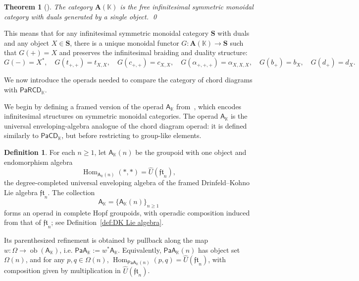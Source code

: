 \documentclass{amsart}
\newcommand{\bA}{\mathbf{A}}
\newcommand{\bS}{\mathbf{S}}
\newcommand{\kk}{\mathbb{K}}    %
\newcommand{\PaA}{\mathsf{PaA}}
\newcommand{\PaRCD}{\mathsf{PaRCD}}
\newcommand{\PaCD}{\mathsf{PaCD}}
\newcommand{\A}{\mathsf{A}}
\newcommand{\magma}{\Omega}
\newcommand{\hA}{{\A}_{\kk}}
\newcommand{\hPaA}{{\PaA}_{\kk}}
\newcommand{\hPaCD}{{\PaCD}_{\kk}}
\newcommand{\hPaRCD}{{\PaRCD}_{\kk}}
\newcommand{\Hom}{\operatorname{Hom}}
\newcommand{\ob}{\operatorname{ob}}
\newtheorem{thm}[theorem]{Theorem}%
\theoremstyle{definition}
\newtheorem{definition}[theorem]{Definition}%
\numberwithin{equation}{section}
\begin{document}


\begin{thm}[\cite{Cartier1992Vessiliev_Invarients, KT_Tangles}]
The category $\bA(\kk)$ is the free infinitesimal symmetric monoidal category with duals generated by a single object. \qed
\end{thm}

This means that for any infinitesimal symmetric monoidal category $\bS$ with duals and any object $X \in \bS$, there is a unique monoidal functor $G: \bA(\kk) \to \bS$ such that $G(+) = X$ and  preserves the infinitesimal braiding and duality structure:
\[
G(-) = X^*, \quad G(t_{+,+}) = t_{X,X}, \quad G(c_{+,+}) = c_{X,X}, \quad G(\alpha_{+,+,+}) = \alpha_{X,X,X}, \quad G(b_{+}) = b_X, \quad G(d_{+}) = d_X.
\]



We now introduce the operads needed to compare the category of chord diagrams with $\hPaRCD$.

We begin by defining a framed version of the operad $\hA$ from~\cite[Section~10.3.1]{FresseBook1}, which encodes infinitesimal structures on symmetric monoidal categories. The operad $\hA$ is the universal enveloping-algebra analogue of the chord diagram operad: it is defined similarly to $\hPaCD$, but before restricting to group-like elements.

\begin{definition}
For each $n\geq 1$, let $\hA(n)$ be the groupoid with one object and endomorphism algebra
\[
\Hom_{\hA(n)}(*,*)=\hat U(\mathfrak{ft}_n),
\]
the degree-completed universal enveloping algebra of the framed Drinfeld--Kohno Lie algebra $\mathfrak{ft}_n$. The collection
\[
\hA=\{\hA(n)\}_{n\geq 1}
\]
forms an operad in complete Hopf groupoids, with operadic composition induced from that of $\mathfrak{ft}_n$; see Definition~\ref{def:DK Lie algebra}.
\end{definition}

Its parenthesized refinement is obtained by pullback along the map $w\colon \magma\to \ob(\hA)$, i.e. $\hPaA:=w^*\hA.$ Equivalently, $\hPaA(n)$ has object set $\magma(n)$, and for any $p,q\in \magma(n)$,
$\Hom_{\hPaA(n)}(p,q)=\hat U(\mathfrak{ft}_n)$,
with composition given by multiplication in $\hat U(\mathfrak{ft}_n)$.
\end{document}
